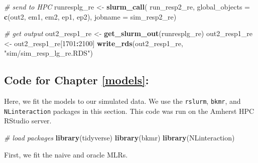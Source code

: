 \documentclass[12pt, twoside]{amherstthesis}
\newenvironment{Shaded}{\begin{snugshade}}{\end{snugshade}}
\newcommand{\AttributeTok}[1]{\textcolor[rgb]{0.13,0.29,0.53}{#1}}
\newcommand{\CommentTok}[1]{\textcolor[rgb]{0.56,0.35,0.01}{\textit{#1}}}
\newcommand{\DecValTok}[1]{\textcolor[rgb]{0.00,0.00,0.81}{#1}}
\newcommand{\FunctionTok}[1]{\textcolor[rgb]{0.13,0.29,0.53}{\textbf{#1}}}
\newcommand{\NormalTok}[1]{#1}
\newcommand{\OtherTok}[1]{\textcolor[rgb]{0.56,0.35,0.01}{#1}}
\newcommand{\SpecialCharTok}[1]{\textcolor[rgb]{0.81,0.36,0.00}{\textbf{#1}}}
\newcommand{\StringTok}[1]{\textcolor[rgb]{0.31,0.60,0.02}{#1}}
\begin{document}
\begin{Shaded}
\begin{Highlighting}[]
\CommentTok{\# send to HPC}
\NormalTok{runresplg\_re }\OtherTok{\textless{}{-}} \FunctionTok{slurm\_call}\NormalTok{(}
\NormalTok{  run\_resp2\_re, }
  \AttributeTok{global\_objects =} \FunctionTok{c}\NormalTok{(}\StringTok{\textquotesingle{}out2\textquotesingle{}}\NormalTok{, }
                     \StringTok{\textquotesingle{}em1\textquotesingle{}}\NormalTok{, }\StringTok{\textquotesingle{}em2\textquotesingle{}}\NormalTok{, }\StringTok{\textquotesingle{}ep1\textquotesingle{}}\NormalTok{, }\StringTok{\textquotesingle{}ep2\textquotesingle{}}\NormalTok{),}
  \AttributeTok{jobname =} \StringTok{\textquotesingle{}sim\_resp2\_re\textquotesingle{}}\NormalTok{)}

\CommentTok{\# get output}
\NormalTok{out2\_resp1\_re }\OtherTok{\textless{}{-}} \FunctionTok{get\_slurm\_out}\NormalTok{(runresplg\_re)}
\NormalTok{out2\_resp1\_re }\OtherTok{\textless{}{-}}\NormalTok{ out2\_resp1\_re[}\DecValTok{1701}\SpecialCharTok{:}\DecValTok{2100}\NormalTok{]}
\FunctionTok{write\_rds}\NormalTok{(out2\_resp1\_re, }\StringTok{"sim/sim\_resp\_lg\_re.RDS"}\NormalTok{)}
\end{Highlighting}
\end{Shaded}
\normalsize

\hypertarget{code-for-chapter-refmodels}{%
\subsection{Code for Chapter \ref{models}:}\label{code-for-chapter-refmodels}}

Here, we fit the models to our simulated data. We use the \texttt{rslurm}, \texttt{bkmr}, and \texttt{NLinteraction} packages in this section. This code was run on the Amherst HPC RStudio server.

\scriptsize
\begin{Shaded}
\begin{Highlighting}[]
\CommentTok{\# load packages }
\FunctionTok{library}\NormalTok{(tidyverse)}
\FunctionTok{library}\NormalTok{(bkmr)}
\FunctionTok{library}\NormalTok{(NLinteraction)}
\end{Highlighting}
\end{Shaded}
\normalsize

First, we fit the naive and oracle MLRs.
\end{document}
